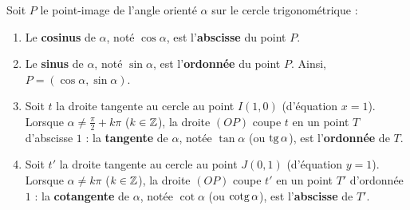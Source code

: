 \begin{definition}
Soit $P$ le point-image de l'angle orienté $\alpha$ sur le cercle trigonométrique :
\begin{enumerate}
    \item Le \textbf{cosinus} de $\alpha$, noté $\cos\alpha$, est l'\textbf{abscisse} du point $P$.
    \item Le \textbf{sinus} de $\alpha$, noté $\sin\alpha$, est l'\textbf{ordonnée} du point $P$. Ainsi, $P = (\cos\alpha, \sin\alpha)$.
    \item Soit $t$ la droite tangente au cercle au point $I(1,0)$ (d'équation $x=1$). Lorsque $\alpha \neq \frac{\pi}{2} + k\pi$ ($k\in\mathbb{Z}$), la droite $(OP)$ coupe $t$ en un point $T$ d'abscisse $1$ : la \textbf{tangente} de $\alpha$, notée $\tan\alpha$ (ou $\operatorname{tg}\alpha$), est l'\textbf{ordonnée} de $T$.
    \item Soit $t'$ la droite tangente au cercle au point $J(0,1)$ (d'équation $y=1$). Lorsque $\alpha \neq k\pi$ ($k\in\mathbb{Z}$), la droite $(OP)$ coupe $t'$ en un point $T'$ d'ordonnée $1$ : la \textbf{cotangente} de $\alpha$, notée $\cot\alpha$ (ou $\operatorname{cotg}\alpha$), est l'\textbf{abscisse} de $T'$.
\end{enumerate}
\end{definition}


